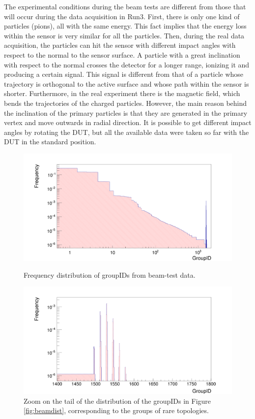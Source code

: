 The experimental conditions during the beam tests are different from those that will occur during the data acquisition in Run3. First, there is only one kind of particles (pions), all with the same energy. This fact implies that the energy loss within the sensor is very similar for all the particles. Then, during the real data acquisition, the particles can hit the sensor with different impact angles with respect to the normal to the sensor surface. A particle with a great inclination with respect to the normal crosses the detector for a longer range, ionizing it and producing a certain signal. This signal is different from that of a particle whose trajectory is orthogonal to the active surface and whose path within the sensor is shorter. Furthermore, in the real experiment there is the magnetic field, which bends the trajectories of the charged particles. However, the main reason behind the inclination of the primary particles is that they are generated in the primary vertex and move outwards in radial direction. 
It is possible to get different impact angles by rotating the DUT, but all the available data were taken so far with the DUT in the standard position.\\
%
\begin{figure}
  \centering
  \includegraphics[scale=0.2]{figures/beamdist.png}
  \caption{Frequency distribution of groupIDs from beam-test data.}
  \label{fig:beamdist}
  \centering
  \includegraphics[scale=0.2]{figures/beamzoom.png}
  \caption{Zoom on the tail of the distribution of the groupIDs in Figure \ref{fig:beamdist}, corresponding to the groups of rare topologies.}
  \label{fig:beamzoom}
\end{figure}
